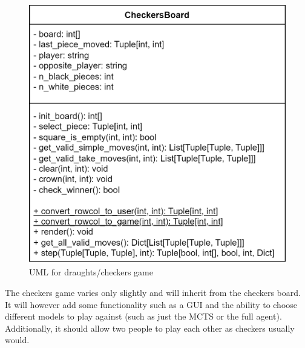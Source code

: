 \documentclass{article}
\begin{document}
    \begin{figure}[h]
        \centering
        \includegraphics[scale = 0.24]{DraughtsUMLdrawio.png}
        \caption{UML for draughts/checkers game}
    \end{figure}

    The checkers game varies only slightly and will inherit from the checkers board. It will however add some functionality such as a GUI and the ability to choose different
    models to play against (such as just the MCTS or the full agent). Additionally, it should allow two people to play each other as checkers usually would.
\end{document}
